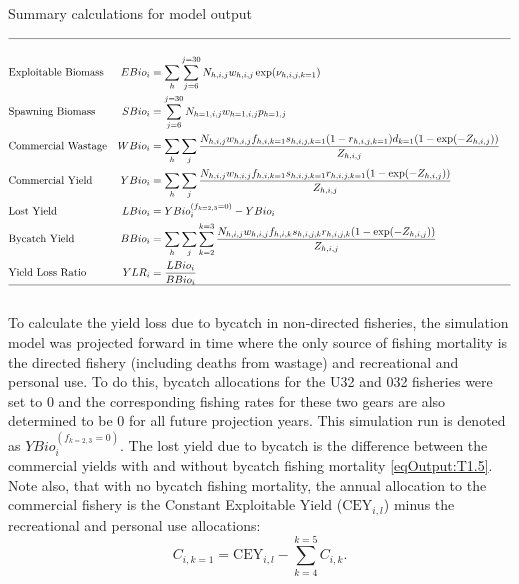 \begin{table}
	\caption{Summary calculations for model output}
	\label{table:ModelOutputs}
	\begin{footnotesize}
		

	\begin{center}
	\tableEq
	\begin{align}
		\hline \nonumber\\
		&\mbox{Exploitable Biomass}
		&EBio_i &= \sum_h \sum_{j=6}^{j=30} N_{h,i,j} w_{h,i,j} \exp(\nu_{h,i,j,k=1})\label{eqOutput:T1.1} \\
		&\mbox{Spawning Biomass}
		&SBio_i &= \sum_{j=6}^{j=30} N_{h=1,i,j} w_{h=1,i,j} p_{h=1,j}\label{eqOutput:T1.2}\\
		&\mbox{Commercial Wastage}
		&WBio_i &= \sum_h \sum_j \frac{N_{h,i,j}w_{h,i,j}f_{h,i,k=1}s_{h,i,j,k=1}(1-r_{h,i,j,k=1})d_{k=1}(1-\exp(-Z_{h,i,j}))}
		{Z_{h,i,j}} \label{eqOutput:T1.3}\\
		&\mbox{Commercial Yield}
		&YBio_i &= \sum_h \sum_j \frac{N_{h,i,j}w_{h,i,j}f_{h,i,k=1}s_{h,i,j,k=1} r_{h,i,j,k=1}(1-\exp(-Z_{h,i,j}))}
		{Z_{h,i,j}}\label{eqOutput:T1.4}\\
		&\mbox{Lost Yield}
		&LBio_i &= YBio_i^{(f_{k=2,3}=0)} - YBio_i \label{eqOutput:T1.5}\\
		&\mbox{Bycatch Yield}
		&BBio_i &= \sum_h \sum_j \sum_{k=2}^{k=3}\frac{N_{h,i,j}w_{h,i,j}f_{h,i,k}s_{h,i,j,k} r_{h,i,j,k}(1-\exp(-Z_{h,i,j}))}
		{Z_{h,i,j}}\label{eqOutput:T1.6}\\
		&\mbox{Yield Loss Ratio}
		&YLR_i & = \frac{LBio_i}{BBio_i}\label{eqOutput:T1.7} \\
		\hline \nonumber
	\end{align}
	\normalEq
	\end{center}
		\end{footnotesize}
\end{table}

To calculate the yield loss due to bycatch in non-directed fisheries, the simulation model was projected forward in time where the only source of fishing mortality is the directed fishery (including deaths from wastage) and  recreational and personal use.  To do this,  bycatch allocations for the U32 and 032 fisheries were set to 0 and the corresponding fishing rates for these two gears are also determined to be 0 for all future projection years.  This simulation run is denoted as $YBio_i^{(f_{k=2,3}=0)}$.  The lost yield due to bycatch is the difference between the commercial yields with and without bycatch fishing mortality \eqref{eqOutput:T1.5}.  Note also, that with no bycatch fishing mortality, the annual allocation to the commercial fishery is the Constant Exploitable Yield ($\mathrm{CEY}_{i,l}$) minus the recreational and personal use allocations:
\[ C_{i,k=1} = \mathrm{CEY}_{i,l} - \sum_{k=4}^{k=5} C_{i,k}. \]

